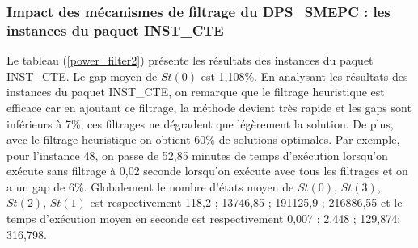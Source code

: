 

\subsubsection{Impact des mécanismes de filtrage du DPS\_SMEPC : les instances du paquet INST\_CTE}
\label{A_power_filter2}
Le tableau (\ref{power_filter2}) présente les résultats des instances du paquet INST\_CTE. 
Le gap moyen de $St(0)$ est 1,108\%.
En analysant les résultats des instances du paquet INST\_CTE, on remarque que le filtrage heuristique est efficace car en ajoutant ce filtrage, la méthode devient très rapide et les gaps sont inférieurs à 7\%, ces filtrages ne dégradent que légèrement la solution. De plus, avec le filtrage heuristique on obtient 60\% de solutions optimales. Par exemple, pour l'instance 48, on passe de 52,85 minutes de temps d'exécution lorsqu'on exécute sans filtrage à 0,02 seconde lorsqu'on exécute avec tous les filtrages et on a un gap de 6\%. 
Globalement le nombre d'états moyen de $St(0)$, $St(3)$, $St(2)$, $St(1)$ est respectivement 118,2
; 13746,85 ; 191125,9 ; 216886,55 
et le temps d'exécution moyen en seconde est respectivement 0,007
; 2,448 ; 129,874; 316,798. 


